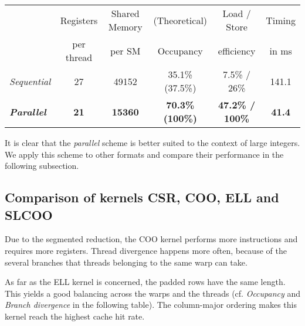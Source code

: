 \documentclass[runningheads,orivec]{llncs}
\begin{document}
\vspace*{-0.25cm}



  \begin{center}
    \begin{tabular}{|l||c|c|c|c||c|}
      \hline
        & \footnotesize Registers & \footnotesize Shared Memory &  \footnotesize (Theoretical) & \footnotesize Load / Store & \footnotesize Timing\\
        & \footnotesize per thread & \footnotesize per SM & \footnotesize Occupancy & \footnotesize efficiency & \footnotesize in ms \\  
      \hline
      \hline
      \small \textit{Sequential} & \footnotesize 27 & \footnotesize 49152 & \footnotesize 35.1\% (37.5\%) & \footnotesize 7.5\% / 26\% & \footnotesize 141.1\\
      \bf \small \textit{Parallel} & \bf \footnotesize 21 & \bf  \footnotesize 15360 & \bf \footnotesize 70.3\% (100\%) & \bf \footnotesize 47.2\% / 100\% & \bf \footnotesize 41.4\\
	  \hline  
    \end{tabular}
  \end{center}



\vspace*{-0.25cm}

It is clear that the \textit{parallel} scheme is better suited to the context of large integers. We apply this scheme to other formats and compare their performance in the following subsection.

\vspace*{-0.25cm}
\subsection{Comparison of kernels CSR, COO, ELL and SLCOO}
\label{subsection: comparison kernels}
\vspace*{-0.25cm}

Due to the segmented reduction, the COO kernel performs more instructions and requires more registers. Thread divergence happens more often, because of the several branches that threads belonging to the same warp can take.

As far as the ELL kernel is concerned, the padded rows have the same length. This yields a good balancing across the warps and the threads (cf. \textit{Occupancy} and \textit{Branch divergence} in the following table). The column-major ordering makes this kernel reach the highest cache hit rate.  
\end{document}

